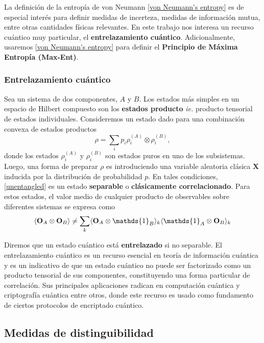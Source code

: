 \documentclass{report} %
\newcommand{\lgg}{\langle}
\newcommand{\rgg}{\rangle}
\newcommand{\ie}{\textit{ie. }}
\numberwithin{equation}{section}
\begin{document}
La definición de la entropía de von Neumann \eqref{von Neumann's entropy} es de especial interés para definir medidas de incerteza, medidas de información mutua, entre otras cantidades físicas relevantes. En este trabajo nos interesa un recurso cuántico muy particular, el \textbf{entrelazamiento cuántico}. Adicionalmente, usaremos \eqref{von Neumann's entropy} para definir el \textbf{Principio de Máxima Entropía (Max-Ent)}.
     
 \subsubsection{Entrelazamiento cuántico}
 
Sea un sistema de dos componentes, $A$ y $B$. Los estados más simples en un espacio de Hilbert compuesto son los \textbf{estados producto} \ie producto tensorial de estados individuales. Consideremos un estado dado para una combinación convexa de estados productos
\begin{equation}
    \rho = \sum_{i} p_i \rho^{(A)}_i \otimes \rho^{(B)}_i, 
    \label{unentangled}
\end{equation}
donde los estados $\rho^{(A)}_i$ y $\rho^{(B)}_i $ son estados puros en uno de los subsistemas. Luego, una forma de preparar $\rho$ es introduciendo una variable aleatoria clásica $\mathbf{X}$ inducida por la distribución de probabilidad $p$. En tales condiciones, \eqref{unentangled} es un estado \textbf{separable} o \textbf{clásicamente correlacionado}. Para estos estados, el valor medio de cualquier producto de observables sobre diferentes sistemas se expresa como
$$\lgg {\bf O}_A \otimes {\bf O}_B \rgg \neq \sum_k \lgg {\bf O}_A \otimes \mathds{1}_{B} \rgg _{k}\lgg \mathds{1}_{A} \otimes {\bf O}_B \rgg_k$$

Diremos que un estado cuántico está \textbf{entrelazado} si no separable. %
El entrelazamiento cuántico es un recurso esencial en teoría de información cuántica
y es un indicativo de que un estado cuántico no puede ser factorizado como un producto tensorial de sus componentes, constituyendo una forma particular de correlación. 
Sus principales aplicaciones radican en computación cuántica \cite{QCJozsa_2003} y criptografía cuántica 
\cite{QCrypto_Ekert, QCrypto_2} entre otros, donde este recurso es usado como fundamento de ciertos protocolos de encriptado cuántico. \\
 
 
 \subsection{Medidas de distinguibilidad}
\end{document}

